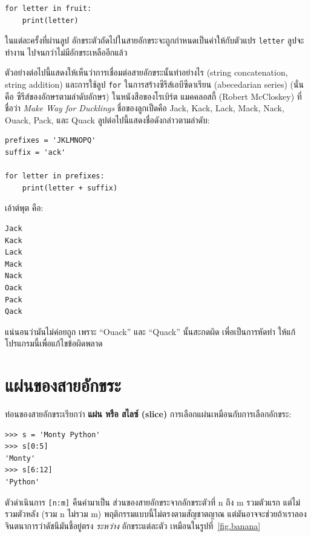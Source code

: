 \begin{verbatim}
for letter in fruit:
    print(letter)
\end{verbatim}
%
ในแต่ละครั้งที่ผ่านลูป อักขระตัวถัดไปในสายอักขระจะถูกกำหนดเป็นค่าให้กับตัวแปร {\tt letter} ลูปจะทำงาน
ไปจนกว่าไม่มีอักขระเหลืออีกแล้ว

ตัวอย่างต่อไปนี้แสดงให้เห็นว่าการเชื่อมต่อสายอักขระนั้นทำอย่างไร (string concatenation, string addition)
และการใช้ลูป {\tt for} ในการสร้างซีรีส์เอบีซีดาเรียน  (abecedarian series) (นั่นคือ 
ซีรีส์ของอักษรตามลำดับอักษร) ในหนังสือของโรเบิร์ต แมคคลอสกี้ (Robert McCloskey) ที่ชื่อว่า {\em Make
Way for Ducklings} ชื่อของลูกเป็ดคือ Jack, Kack, Lack, Mack, Nack, Ouack, Pack, และ 
Quack ลูปต่อไปนี้แสดงชื่อดังกล่าวตามลำดับ:  

\begin{verbatim}
prefixes = 'JKLMNOPQ'
suffix = 'ack'

for letter in prefixes:
    print(letter + suffix)
\end{verbatim}
%
เอ้าต์พุต คือ:

\begin{verbatim}
Jack
Kack
Lack
Mack
Nack
Oack
Pack
Qack
\end{verbatim}
%
แน่นอนว่ามันไม่ค่อยถูก เพราะ ``Ouack'' และ ``Quack'' นั้นสะกดผิด เพื่อเป็นการหัดทำ
ให้แก้โปรแกรมนี้เพื่อแก้ไขข้อผิดพลาด


\section{แผ่นของสายอักขระ } %
\label{slice}
  
 
  
 

ท่อนของสายอักขระเรียกว่า {\bf แผ่น หรือ สไลซ์ (slice)} การเลือกแผ่นเหมือนกับการเลือกอักขระ:

\begin{verbatim}
>>> s = 'Monty Python'
>>> s[0:5]
'Monty'
>>> s[6:12]
'Python'
\end{verbatim}
%
ตัวดำเนินการ {\tt [n:m]} คืนค่ามาเป็น ส่วนของสายอักขระจากอักขระตัวที่ n ถึง m 
รวมตัวแรก แต่ไม่รวมตัวหลัง (รวม n ไม่รวม m) พฤติกรรมแบบนี้ไม่ตรงตามสัญชาตญาณ 
แต่มันอาจจะช่วยถ้าเราลองจินตนาการว่าดัชนีมันชี้อยู่ตรง {\em ระหว่าง} อักขระแต่ละตัว เหมือนในรูปที่~\ref{fig.banana}

